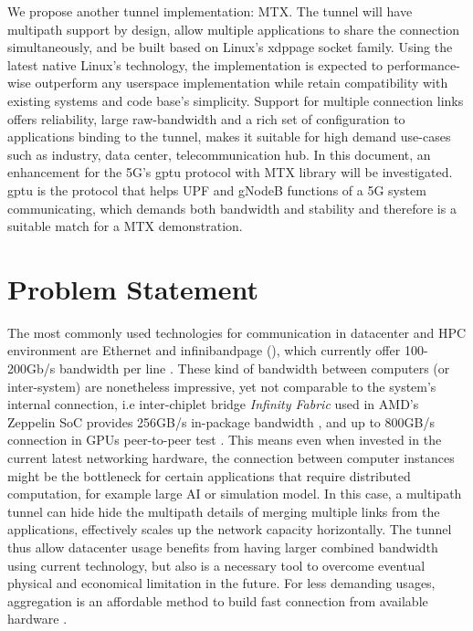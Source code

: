 We propose another tunnel implementation: \ac{MTX}. 
The tunnel will have multipath support by design, allow multiple applications to share the connection simultaneously, and be built based on Linux's \ac{xdppage} socket family.
Using the latest native Linux's technology, the implementation is expected to performance-wise outperform any userspace implementation while retain compatibility with existing systems and code base's simplicity. 
Support for multiple connection links offers reliability, large raw-bandwidth and a rich set of configuration to applications binding to the tunnel, makes it suitable for high demand use-cases such as industry, data center, telecommunication hub. 
In this document, an enhancement for the 5G's \ac{gptu} protocol  with \ac{MTX} library will be investigated. \ac{gptu} is the protocol that helps UPF and gNodeB functions of a 5G system communicating, which demands both bandwidth and stability and therefore is a suitable match for a \ac{MTX} demonstration.


\section{Problem Statement}\label{sec:introduction:problem_statement}
The most commonly used technologies for communication in datacenter and \ac{HPC} environment are Ethernet and \ac{infinibandpage} (), which currently offer 100-200Gb/s bandwidth per line \cite{ethernet_roadmap}\cite{infiniband_roadmap}.
These kind of bandwidth between computers (or inter-system) are nonetheless impressive, yet not comparable to the system's internal connection, i.e inter-chiplet bridge \textit{Infinity Fabric} used in AMD's Zeppelin SoC provides 256GB/s in-package bandwidth \cite{burd_zeppelin_2019}, and up to 800GB/s connection in GPUs peer-to-peer test \cite{amd_infinity_architecture}.
This means even when invested in the current latest networking hardware, the connection between computer instances might be the bottleneck for certain applications that require distributed computation, for example large \ac{AI} or simulation model.
In this case, a multipath tunnel can hide hide the multipath details of merging multiple links from the applications, effectively scales up the network capacity horizontally.
The tunnel thus allow datacenter usage benefits from having larger combined bandwidth using current technology, but also is a necessary tool to overcome eventual physical and economical limitation in the future.
For less demanding usages, aggregation is an affordable method to build fast connection from available hardware .

